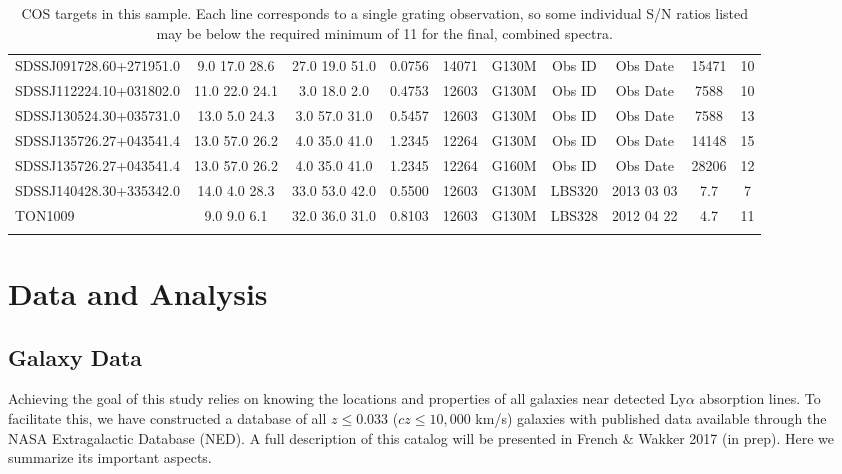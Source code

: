 \documentclass[iop]{emulateapj-rtx4}
\begin{document}
\begin{table}[ht]
\begin{center}
\begin{tabular}{l c c c c c c c c c}
SDSSJ091728.60+271951.0  & 9.0  17.0  28.6  &    27.0  19.0  51.0  &    0.0756  & 14071  &   G130M  &   Obs ID  & Obs Date  & 15471  &      10         \\
SDSSJ112224.10+031802.0  & 11.0  22.0  24.1  &   3.0  18.0  2.0  &      0.4753  & 12603  &   G130M  &   Obs ID  & Obs Date  & 7588  &       10         \\
SDSSJ130524.30+035731.0  & 13.0  5.0  24.3  &    3.0  57.0  31.0  &     0.5457  & 12603  &   G130M  &   Obs ID  & Obs Date  & 7588  &       13         \\
SDSSJ135726.27+043541.4  & 13.0  57.0  26.2  &   4.0  35.0  41.0  &     1.2345  & 12264  &   G130M  &   Obs ID  & Obs Date  & 14148  &      15         \\
SDSSJ135726.27+043541.4  & 13.0  57.0  26.2  &   4.0  35.0  41.0  &     1.2345  & 12264  &   G160M  &   Obs ID  & Obs Date  & 28206  &      12         \\

SDSSJ140428.30+335342.0  & 14.0  4.0  28.3  &    33.0  53.0  42.0  &    0.5500  & 12603  &   G130M  &   LBS320   & 2013 03 03   &     7.7  &       7          \\
TON1009  			       &  9.0  9.0  6.1  &      32.0  36.0  31.0  &    0.8103  & 12603  &   G130M  &   LBS328   & 2012 04 22   &    4.7  &       11         \\

 \\
\hline

\end{tabular}
\end{center}
  \caption{\small{COS targets in this sample. Each line corresponds to a single grating observation, so some individual S/N ratios listed may be below the required minimum of 11 for the final, combined spectra.}}
  \label{target_table}
\end{table}


\section{Data and Analysis}

\subsection{Galaxy Data}

Achieving the goal of this study relies on knowing the locations and properties of all galaxies near detected Ly$\alpha$ absorption lines. To facilitate this, we have constructed a database of all $z\leq 0.033$ ($cz\leq 10,000$ km/s) galaxies with published data available through the NASA Extragalactic Database (NED). A full description of this catalog will be presented in French $\&$ Wakker 2017 (in prep). Here we summarize its important aspects. 
\end{document}
